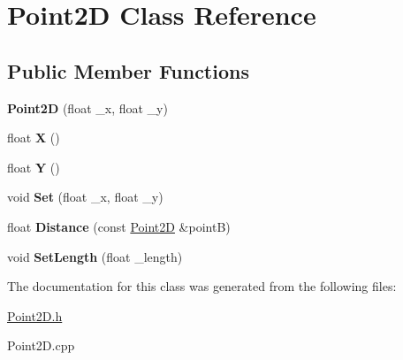 \hypertarget{class_point2_d}{\section{Point2\-D Class Reference}
\label{class_point2_d}
}
\subsection*{Public Member Functions}
\begin{DoxyCompactItemize}
\item 
\hypertarget{class_point2_d_a3ad4c92ddc32fbb62c9b189355bd4530}{{\bfseries Point2\-D} (float \-\_\-x, float \-\_\-y)}\label{class_point2_d_a3ad4c92ddc32fbb62c9b189355bd4530}

\item 
\hypertarget{class_point2_d_a6151401987d5f802fa5a03d3936da5ad}{float {\bfseries X} ()}\label{class_point2_d_a6151401987d5f802fa5a03d3936da5ad}

\item 
\hypertarget{class_point2_d_aa736b0dba175039f426f8129a317917b}{float {\bfseries Y} ()}\label{class_point2_d_aa736b0dba175039f426f8129a317917b}

\item 
\hypertarget{class_point2_d_a60b3fea0bd76c3899355fb7048c4e0bc}{void {\bfseries Set} (float \-\_\-x, float \-\_\-y)}\label{class_point2_d_a60b3fea0bd76c3899355fb7048c4e0bc}

\item 
\hypertarget{class_point2_d_a75f1c923356d656782fc21b5590e9744}{float {\bfseries Distance} (const \hyperlink{class_point2_d}{Point2\-D} \&point\-B)}\label{class_point2_d_a75f1c923356d656782fc21b5590e9744}

\item 
\hypertarget{class_point2_d_ac9db38a9b617f6a7871b9501f4ecdc12}{void {\bfseries Set\-Length} (float \-\_\-length)}\label{class_point2_d_ac9db38a9b617f6a7871b9501f4ecdc12}

\end{DoxyCompactItemize}


The documentation for this class was generated from the following files\-:\begin{DoxyCompactItemize}
\item 
\hyperlink{_point2_d_8h}{Point2\-D.\-h}\item 
Point2\-D.\-cpp\end{DoxyCompactItemize}
